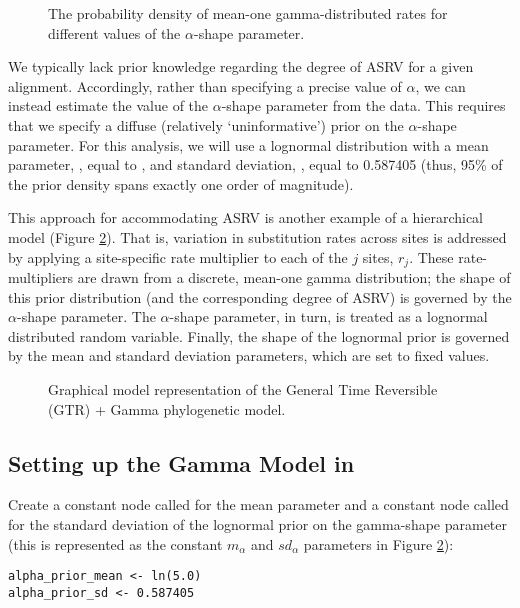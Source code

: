 \begin{figure}[h]
\centering
{}
\caption{\small The probability density of mean-one gamma-distributed rates for different values of the $\alpha$-shape parameter.}
\label{asrhGammaFig}
\end{figure}

We typically lack prior knowledge regarding the degree of ASRV for a given alignment.
Accordingly, rather than specifying a precise value of $\alpha$, we can instead estimate the value of the $\alpha$-shape parameter from the data.
This requires that we specify a diffuse (relatively `uninformative') prior on the $\alpha$-shape parameter.
For this analysis, we will use a lognormal distribution with a mean parameter, , equal to , and standard deviation, , equal to 0.587405 (thus, 95\% of the prior density spans exactly one order of magnitude).

This approach for accommodating ASRV is another example of a hierarchical model (Figure \ref{fig:gtrg}).
That is, variation in substitution rates across sites is addressed by applying a site-specific rate multiplier to each of the $j$ sites, $r_j$.
These rate-multipliers are drawn from a discrete, mean-one gamma distribution; the shape of this prior distribution (and the corresponding degree of ASRV) is governed by the $\alpha$-shape parameter.
The $\alpha$-shape parameter, in turn, is treated as a lognormal distributed random variable.
Finally, the shape of the lognormal prior is governed by the mean and standard deviation parameters, which are set to fixed values.   

\begin{figure}[h!]
\centering
{}
\caption{\small Graphical model representation of the General Time Reversible (GTR) + Gamma phylogenetic model.}
\label{fig:gtrg}
\end{figure}

\subsection{Setting up the Gamma Model in \RevBayes}

Create a constant node called  for the mean parameter and a constant node called  for the standard deviation of the lognormal prior on the gamma-shape parameter (this is represented as the constant $m_\alpha$ and $sd_\alpha$ parameters in Figure \ref{fig:gtrg}):
{\tt\begin{snugshade*}
\begin{lstlisting}
alpha_prior_mean <- ln(5.0)
alpha_prior_sd <- 0.587405
\end{lstlisting}
\end{snugshade*}}

